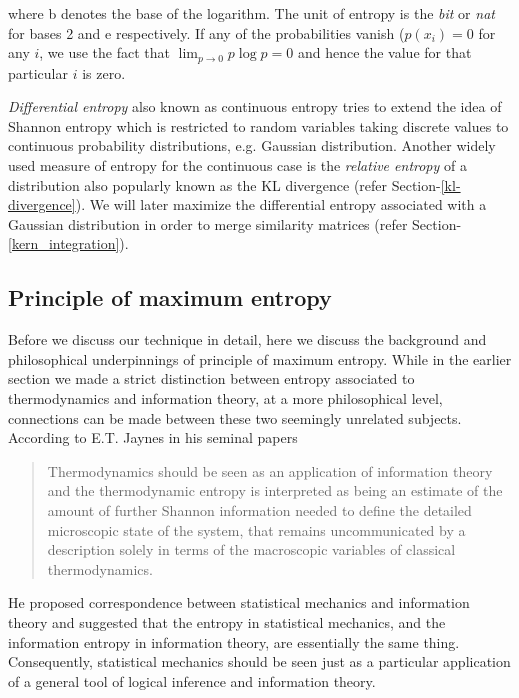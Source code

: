 where b denotes the base of the logarithm. The unit of entropy is the \textit{bit} or \textit{nat} for bases 2 and e respectively. If any of the probabilities vanish ($p(x_i) = 0$ for any $i$, we use the fact that $\lim_{p\to0}p\log p = 0$ and hence the value for that particular $i$ is zero. 

\textit{Differential entropy} also known as continuous entropy tries to extend the idea of Shannon entropy which is restricted to random variables taking discrete values to continuous probability distributions, e.g. Gaussian distribution. Another widely used measure of entropy for the continuous case is the \textit{relative entropy} of a distribution also popularly known as the KL divergence (refer Section-\ref{kl-divergence}). We will later maximize the differential entropy associated with a 
Gaussian distribution in order to merge similarity matrices (refer Section-\ref{kern_integration}). 


\subsection{Principle of maximum entropy} \label{maxent_principle}
Before we discuss our technique in detail, here we discuss the background and philosophical underpinnings of principle of maximum entropy. While in the earlier section we made a strict distinction between entropy associated to thermodynamics and information theory, at a more philosophical level, connections can be made between these two seemingly unrelated subjects. According to E.T. Jaynes in his seminal papers \citep{jaynes57maxent, jaynes82onrationale} 
\begin{quotation}
Thermodynamics should be seen as an application of information theory and the thermodynamic entropy is interpreted as being an estimate of the amount of further Shannon information needed to define the detailed microscopic state of the system, that remains uncommunicated by a description solely in terms of the macroscopic variables of classical thermodynamics. 
\end{quotation}
He proposed correspondence between statistical mechanics and information theory and suggested that the entropy in statistical mechanics, and the information entropy in information theory, are essentially the same thing. Consequently, statistical mechanics should be seen just as a particular application of a general tool of logical inference and information theory.

